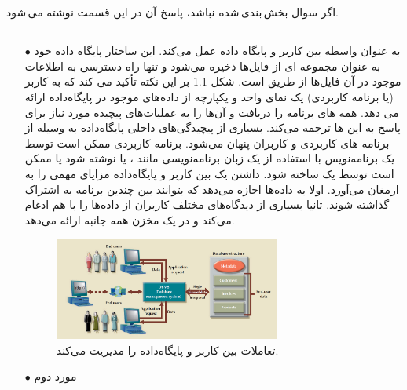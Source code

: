 \documentclass{article}
\begin{document}


\newpage

\section{}
اگر سوال بخش\,بندی\,شده نباشد، پاسخ آن در این قسمت نوشته می\,شود.
\subsection{}
\begin{itemize}
    \item [$\bullet$]
    به عنوان واسطه بین کاربر و پایگاه داده عمل می‌کند. این ساختار پایگاه داده خود به عنوان مجموعه ای از فایل‌ها ذخیره می‌شود و تنها راه دسترسی به اطلاعات موجود در آن فایل‌ها از طریق 
است.
شکل 1.1 بر این نکته تأکید می کند که
به کاربر (یا برنامه کاربردی) یک نمای واحد و یکپارچه از داده‌های موجود در پایگاه‌داده ارائه می دهد.
همه 
‌های برنامه را دریافت و آن‌ها را به عملیات‌های پیچیده مورد نیاز برای پاسخ به 
این
‌ها
ترجمه می‌کند.
بسیاری از پیچیدگی‌های داخلی پایگاه‌داده به وسیله 
از برنامه های کاربردی و کاربران پنهان می‌شود.
برنامه کاربردی ممکن است توسط یک برنامه‌نویس با استفاده از یک زبان برنامه‌نویسی مانند 
	، 
یا
نوشته شود یا ممکن است توسط یک
ساخته شود.
داشتن یک
بین
کاربر و پایگاه‌داده مزایای مهمی را به ارمغان می‌آورد. اولا
به داده‌ها اجازه می‌دهد که بتوانند بین چندین برنامه به اشتراک گذاشته شوند. ثانیا
بسیاری از دیدگاه‌های مختلف کاربران از داده‌ها را با هم ادغام می‌کند و در یک مخزن همه جانبه ارائه می‌دهد.
\begin{figure}[ht]
    \centering
    \includegraphics[width=0.7\textwidth]{figures/1.1.png}
    \caption
	{
تعاملات بین کاربر و پایگاه‌داده را مدیریت می‌کند.
	}
    \label{fig:fig1}
\end{figure}


    \item [$\bullet$] مورد دوم
\end{itemize}
\end{document}
